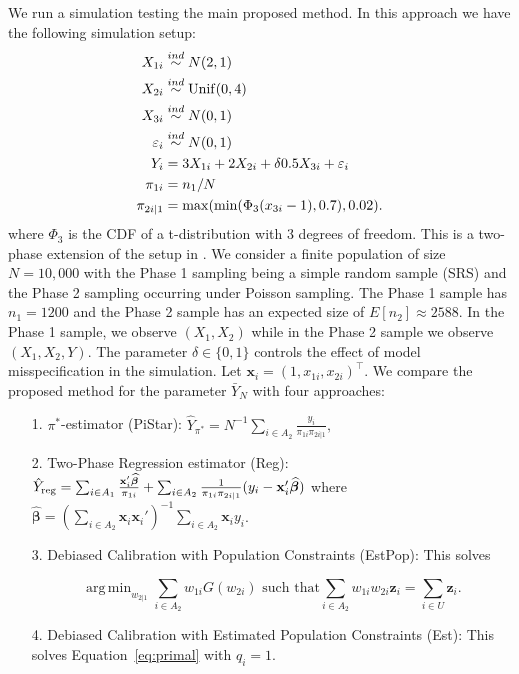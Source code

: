 \documentclass[12pt]{article}
\DeclareMathOperator*{\argmin}{arg\,min}
\renewcommand{\bf}[1]{\mathbf{#1}}
\begin{document}
We run a simulation testing the main proposed method. In this approach we have the
following simulation setup:
$$
\begin{aligned}
X_{1i} &\stackrel{ind}{\sim} N(2, 1) \\
X_{2i} &\stackrel{ind}{\sim} \rm{Unif}(0, 4) \\
X_{3i} &\stackrel{ind}{\sim} N(0, 1) \\
\varepsilon_i &\stackrel{ind}{\sim} N(0, 1) \\
Y_{i} &= 3 X_{1i} + 2 X_{2i} + \delta 0.5 X_{3i} + \varepsilon_i \\
\pi_{1i} &= n_1 / N \\
\pi_{2i|1} &= \max(\min(\Phi_3(x_{3i} - 1), 0.7), 0.02).
\end{aligned}
$$
where $\Phi_3$ is the CDF of a t-distribution with 3 degrees of freedom.
This is a two-phase extension of the setup in \cite{kwon2024debiased}. We
consider a finite population of size $N = 10,000$ with the Phase 1 sampling
being a simple random sample (SRS) and the 
Phase 2 sampling occurring under Poisson sampling. The Phase 1 sample has
$n_1 = 1200$ and the Phase 2 sample has an expected size of
$E[n_2] \approx 2588$. In the Phase 1 sample, we observe 
$(X_1, X_2)$ while in the Phase 2 sample we observe $(X_1, X_2, Y)$. 
The parameter $\delta \in \{0, 1\}$ controls the effect of model misspecification
in the simulation. Let $\bf x_i = (1, x_{1i}, x_{2i})^\top$. We compare the
proposed method for the parameter $\bar Y_N$ with four approaches:

\begin{itemize}
  \item[1.] $\pi^*$-estimator (PiStar): $\hat Y_{\pi^*} = N^{-1} \sum_{i \in A_2}
    \frac{y_i}{\pi_{1i} \pi_{2i|1}},$
  \item[2.] Two-Phase Regression estimator (Reg): 
    $\hat Y_{\rm reg} = 
    \sum_{i \in A_1} \frac{\bf x_i' \widehat{\bm \beta}}{\pi_{1i}} + 
    \sum_{i \in A_2} \frac{1}{\pi_{1i}\pi_{2i|1}}(y_i - \bf x_i' \widehat{\bm \beta})$ 
    where $\widehat{\bm \beta} = 
    \left(\sum_{i \in A_2} \bf x_i \bf x_i'\right)^{-1} \sum_{i \in A_2} \bf x_i y_i$.
  \item[3.] Debiased Calibration with Population Constraints (EstPop): This 
    solves 

  \begin{equation}
    \argmin_{w_{2|1}} \sum_{i \in A_2} w_{1i} G(w_{2i}) \text{ such that}
    \sum_{i \in A_2} w_{1i} w_{2i} \bf z_i = \sum_{i \in U} \bf z_i.
  \end{equation}

  \item[4.] Debiased Calibration with Estimated Population Constraints (Est):
    This solves Equation~\eqref{eq:primal} with $q_i = 1$.
\end{itemize}
\end{document}
